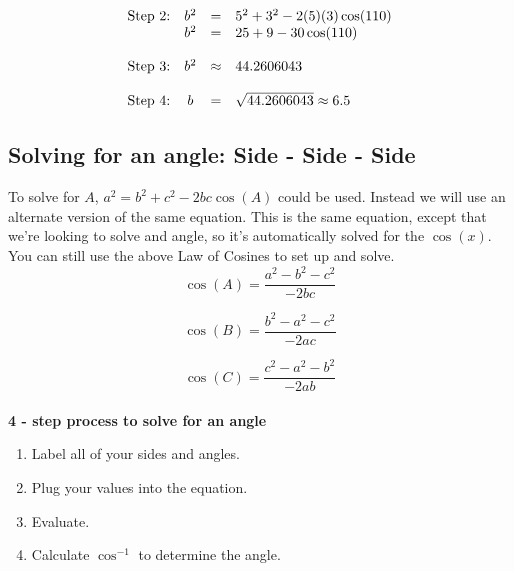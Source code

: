 \documentclass[12pt]{article}
\begin{document}
\[
\begin{array}{c c c l }
\text{Step 2:}	& b^2 	& = 		& 5^2+3^2-2(5)(3)\cos(110) 	\\		\vspace{12pt}
				& b^2 	& = 		& 25+9-30\cos(110) 			 \\ 	\vspace{12pt}
\text{Step 3:}	& b^2 	& \approx 	& 44.2606043				 \\	%
\text{Step 4:}	& b 	& = 		& \sqrt{44.2606043} \approx 6.5  \\
\end{array}
\]



\subsection*{Solving for an angle: Side - Side - Side}



To solve for $A$, $a^2=b^2+c^2-2bc\cos(A)$ could be used. Instead we will use an alternate version of the same equation. This is the same equation, except that we're looking to solve and angle, so it's automatically solved for the $\cos(x)$. You can still use the above Law of Cosines to set up and solve.\\

$$\cos(A)=\frac{a^2-b^2-c^2}{-2bc}$$

$$\cos(B)=\frac{b^2-a^2-c^2}{-2ac}$$

$$\cos(C)=\frac{c^2-a^2-b^2}{-2ab}$$\\

\textbf{4 - step process to solve for an angle}

\begin{enumerate}

\item Label all of your sides and angles.\\

\item Plug your values into the equation.\\

\item Evaluate.\\

\item Calculate $\cos^{-1}$ to determine the angle.\\
\end{enumerate}

\end{document}
